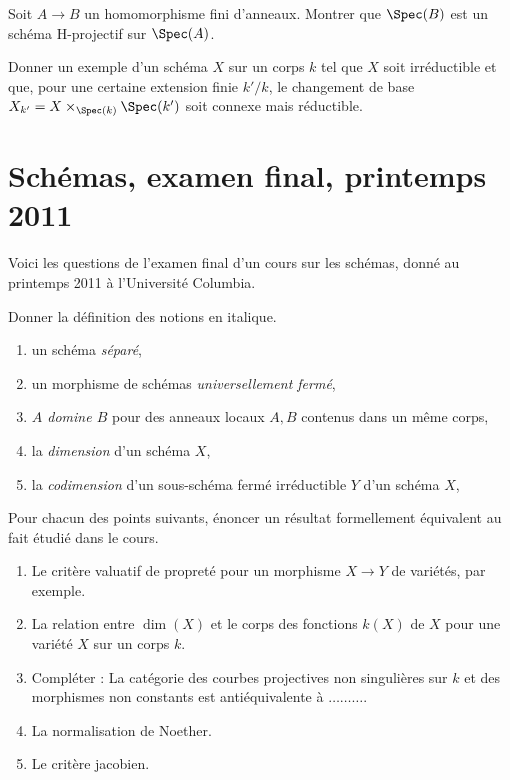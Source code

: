 \begin{exercise}
\label{exercise-finite-is-projective}
Soit $A \to B$ un homomorphisme fini d'anneaux. Montrer que
$\Spec(B)$ est un schéma H-projectif sur $\Spec(A)$.
\end{exercise}

\begin{exercise}
\label{exercise-not-geometrically-irreducible}
Donner un exemple d'un schéma $X$ sur un corps $k$ tel que
$X$ soit irréductible et que, pour une certaine extension finie $k'/k$,
le changement de base $X_{k'} = X \times_{\Spec(k)} \Spec(k')$
soit connexe mais réductible.
\end{exercise}





\section{Schémas, examen final, printemps 2011}
\label{section-final-exam-spring-2011}

\noindent
Voici les questions de l'examen final d'un cours sur les schémas,
donné au printemps 2011 à l'Université Columbia.

\begin{exercise}[Définitions]
\label{exercise-definitions-spring-2011}
Donner la définition des notions en italique.
\begin{enumerate}
\item un schéma {\it séparé},
\item un morphisme de schémas {\it universellement fermé},
\item {\it $A$ domine $B$} pour des anneaux locaux $A, B$ contenus dans un
même corps,
\item la {\it dimension} d'un schéma $X$,
\item la {\it codimension} d'un sous-schéma fermé irréductible $Y$
d'un schéma $X$,
\end{enumerate}
\end{exercise}

\begin{exercise}[Résultats]
\label{exercise-results-spring-2011}
Pour chacun des points suivants, énoncer un résultat formellement équivalent au fait étudié
dans le cours.
\begin{enumerate}
\item Le critère valuatif de propreté pour un morphisme
$X \to Y$ de variétés, par exemple.
\item La relation entre $\dim(X)$ et le corps des fonctions
$k(X)$ de $X$ pour une variété $X$ sur un corps $k$.
\item Compléter : La catégorie des courbes projectives non singulières sur
$k$ et des morphismes non constants est antiéquivalente à $\ldots\ldots\ldots$.
\item La normalisation de Noether.
\item Le critère jacobien.
\end{enumerate}
\end{exercise}

